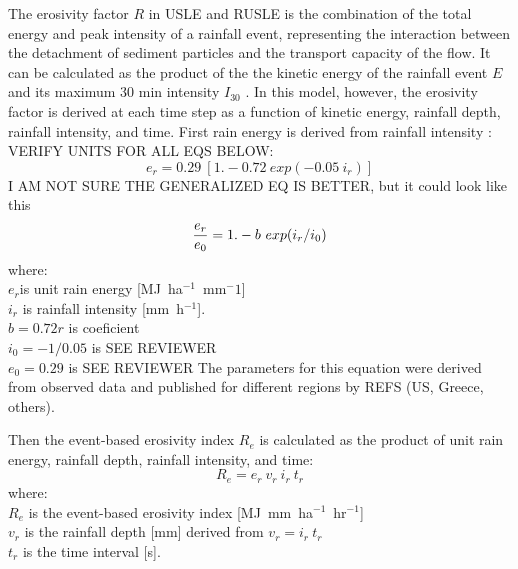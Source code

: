 \documentclass[gmd, manuscript]{copernicus}
\begin{document}
The erosivity factor $R$ 
in USLE and RUSLE 
is the combination of the total energy 
and peak intensity of a rainfall event,
representing the interaction 
between the detachment of sediment particles
and the transport capacity of the flow. 
It can be calculated as the product of the 
the kinetic energy of the rainfall event $E$
and its maximum 30 \unit{min} intensity $I_{30}$
\citep{Brown1987,Renard1997}.
In this model, however, the erosivity factor
is derived at each time step as a function of
kinetic energy, rainfall depth, rainfall intensity, and time.
First rain energy is derived from rainfall intensity \citep{Brown1987}:
VERIFY UNITS FOR ALL EQS BELOW:
%
\begin{equation}
\label{eq:rain_energy}
{e_r = 0.29 ~ [1.-0.72 ~ exp(-0.05 ~ i_r)]}
\end{equation}
I AM NOT SURE THE GENERALIZED EQ IS BETTER, but it could look like this
\begin{equation}
\label{eq:rain_energy}
{e_r \over e_0} = 1.- b ~ exp(i_r/i_0)
\end{equation}
%
{\small
\noindent
where: \\
\noindent
\hspace*{0.5em} $e_r$is unit rain energy [\unit{MJ~ha}$^{-1}$~\unit{mm}${^-1}$]\\
\hspace*{0.5em} $i_r$ is rainfall intensity [\unit{mm~h}$^{-1}$].\\
\hspace*{0.5em} $b=0.72r$ is coeficient\\
\hspace*{0.5em} $i_0=-1/0.05$ is SEE REVIEWER\\
\hspace*{0.5em} $e_0=0.29$ is SEE REVIEWER
}
The parameters for this equation were derived from observed data and published for different regions by
REFS (US, Greece, others).

\noindent
Then the event-based erosivity index $R_e$ 
is calculated as the product of 
unit rain energy, rainfall depth, rainfall intensity, and time: 
\begin{equation}
\label{eq:erosivity_index}
{R_e = e_r ~ v_r ~ i_r ~ t_r}
\end{equation}
%
{\small
\noindent
where: \\
\hspace*{0.5em} $R_e$ is the event-based erosivity index [\unit{MJ~mm~ha}$^{-1}$~\unit{hr}$^{-1}$]\\
\hspace*{0.5em} $v_r$ is the rainfall depth [\unit{mm}] derived from ${v_r = i_r~t_r}$\\
\hspace*{0.5em} $t_r$ is the time interval [\unit{s}].
}
\end{document}
